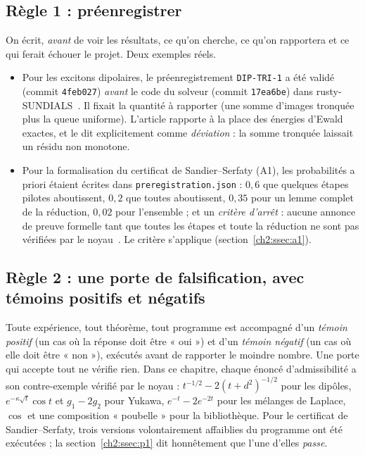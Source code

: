\subsection{Règle 1 : préenregistrer}\label{ch2:ssec:prereg}
On écrit, \emph{avant} de voir les résultats, ce qu'on cherche, ce qu'on rapportera et ce qui ferait échouer le
projet. Deux exemples réels.
\begin{itemize}
\item Pour les excitons dipolaires, le préenregistrement \texttt{DIP-TRI-1} a été validé (commit
\texttt{4feb027}) \emph{avant} le code du solveur (commit \texttt{17ea6be}) dans rusty-SUNDIALS~\cite{ch2dip}. Il fixait
la quantité à rapporter (une somme d'images tronquée plus la queue uniforme). L'article rapporte à la place des énergies
d'Ewald exactes, et le dit explicitement comme \emph{déviation} : la somme tronquée laissait un résidu non monotone.
\item Pour la formalisation du certificat de Sandier--Serfaty (A1), les probabilités a priori étaient écrites dans
\texttt{preregistration.json} : $0{,}6$ que quelques étapes pilotes aboutissent, $0{,}2$ que toutes aboutissent, $0{,}35$
pour un lemme complet de la réduction, $0{,}02$ pour l'ensemble ; et un \emph{critère d'arrêt} : aucune annonce de preuve
formelle tant que toutes les étapes et toute la réduction ne sont pas vérifiées par le noyau~\cite{ch2ssl}. Le critère
s'applique (section~\ref{ch2:ssec:a1}).
\end{itemize}

\subsection{Règle 2 : une porte de falsification, avec témoins positifs et négatifs}\label{ch2:ssec:falsif}
Toute expérience, tout théorème, tout programme est accompagné d'un \emph{témoin positif} (un cas où la réponse doit
être « oui ») et d'un \emph{témoin négatif} (un cas où elle doit être « non »), exécutés avant de rapporter le moindre
nombre. Une porte qui accepte tout ne vérifie rien. Dans ce chapitre, chaque énoncé d'admissibilité a son contre-exemple
vérifié par le noyau : $t^{-1/2}-2(t+d^2)^{-1/2}$ pour les dipôles, $e^{-\kappa\sqrt t}\cos t$ et $g_1-2g_2$ pour
Yukawa, $e^{-t}-2e^{-2t}$ pour les mélanges de Laplace, $\cos$ et une composition « poubelle » pour la bibliothèque.
Pour le certificat de Sandier--Serfaty, trois versions volontairement affaiblies du programme ont été exécutées ; la
section~\ref{ch2:ssec:p1} dit honnêtement que l'une d'elles \emph{passe}.

